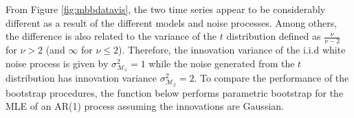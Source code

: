 \documentclass[]{book}
\newenvironment{Shaded}{\begin{snugshade}}{\end{snugshade}}
\newcommand{\KeywordTok}[1]{\textcolor[rgb]{0.13,0.29,0.53}{\textbf{#1}}}
\newcommand{\DataTypeTok}[1]{\textcolor[rgb]{0.13,0.29,0.53}{#1}}
\newcommand{\DecValTok}[1]{\textcolor[rgb]{0.00,0.00,0.81}{#1}}
\newcommand{\StringTok}[1]{\textcolor[rgb]{0.31,0.60,0.02}{#1}}
\newcommand{\CommentTok}[1]{\textcolor[rgb]{0.56,0.35,0.01}{\textit{#1}}}
\newcommand{\OtherTok}[1]{\textcolor[rgb]{0.56,0.35,0.01}{#1}}
\newcommand{\ControlFlowTok}[1]{\textcolor[rgb]{0.13,0.29,0.53}{\textbf{#1}}}
\newcommand{\OperatorTok}[1]{\textcolor[rgb]{0.81,0.36,0.00}{\textbf{#1}}}
\newcommand{\NormalTok}[1]{#1}
\theoremstyle{definition}
\theoremstyle{definition}
\theoremstyle{definition}
\theoremstyle{remark}
\begin{document}
From Figure \ref{fig:mbbdatavis}, the two time series appear to be
considerably different as a result of the different models and noise
processes. Among others, the difference is also related to the variance
of the \(t\) distribution defined as \(\frac{\nu}{\nu-2}\) for
\(\nu > 2\) (and \(\infty\) for \(\nu \le 2\)). Therefore, the
innovation variance of the i.i.d white noise process is given by
\(\sigma^2_{\mathcal{M}_1} = 1\) while the noise generated from the
\(t\) distribution has innovation variance
\(\sigma^2_{\mathcal{M}_2} = 2\). To compare the performance of the
bootstrap procedures, the function below performs parametric bootstrap
for the MLE of an AR(1) process assuming the innovations are Gaussian.

\begin{Shaded}
\end{Shaded}
\end{document}
